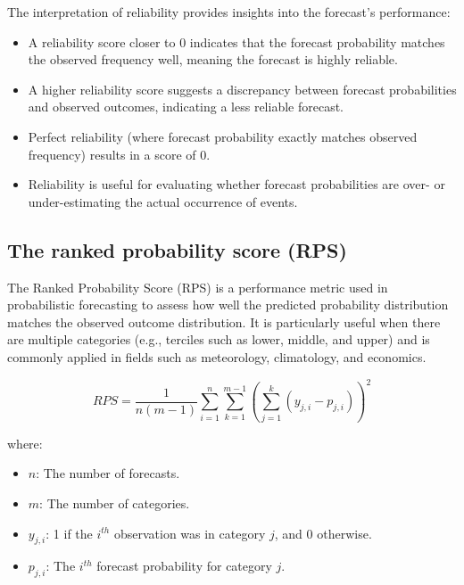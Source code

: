 The interpretation of reliability provides insights into the forecast's performance:  
\begin{itemize}
    \item A reliability score closer to 0 indicates that the forecast probability matches the observed frequency well, meaning the forecast is highly reliable.  
    \item A higher reliability score suggests a discrepancy between forecast probabilities and observed outcomes, indicating a less reliable forecast.  
    \item Perfect reliability (where forecast probability exactly matches observed frequency) results in a score of 0.  
    \item Reliability is useful for evaluating whether forecast probabilities are over- or under-estimating the actual occurrence of events.  
\end{itemize}



\subsection{The ranked probability score (RPS)}
The Ranked Probability Score (RPS) is a performance metric used in probabilistic forecasting to assess how well the predicted probability distribution matches the observed outcome distribution. It is particularly useful when there are multiple categories (e.g., terciles such as lower, middle, and upper) and is commonly applied in fields such as meteorology, climatology, and economics.

\[
RPS = \frac{1}{n(m-1)} \sum_{i=1}^{n} \sum_{k=1}^{m-1} \left( \sum_{j=1}^{k} (y_{j,i} - p_{j,i}) \right)^2
\]

where:  
\begin{itemize}
    \item \( n \): The number of forecasts.  
    \item \( m \): The number of categories.  
    \item \( y_{j,i} \): 1 if the \( i^{th} \) observation was in category \( j \), and 0 otherwise.  
    \item \( p_{j,i} \): The \( i^{th} \) forecast probability for category \( j \).  
\end{itemize}

